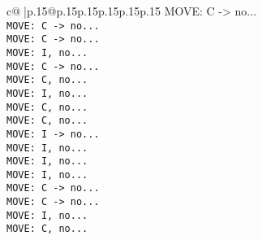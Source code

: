 \documentclass{article}
\begin{document}
{\begin{supertabular}{c@{$\;$}|p{.15\linewidth}@{}p{.15\linewidth}p{.15\linewidth}p{.15\linewidth}p{.15\linewidth}p{.15\linewidth}}
{{{ MOVE: C -> no...\\ \tt  MOVE: C -> no...\\ \tt  MOVE: C -> no...\\ \tt  MOVE: I, no...\\ \tt  MOVE: C -> no...\\ \tt  MOVE: C, no...\\ \tt  MOVE: I, no...\\ \tt  MOVE: C, no...\\ \tt  MOVE: C, no...\\ \tt  MOVE: I -> no...\\ \tt  MOVE: I, no...\\ \tt  MOVE: I, no...\\ \tt  MOVE: I, no...\\ \tt  MOVE: C -> no...\\ \tt  MOVE: C -> no...\\ \tt  MOVE: I, no...\\ \tt  MOVE: C, no...}}}
\end{supertabular}}
\end{document}
